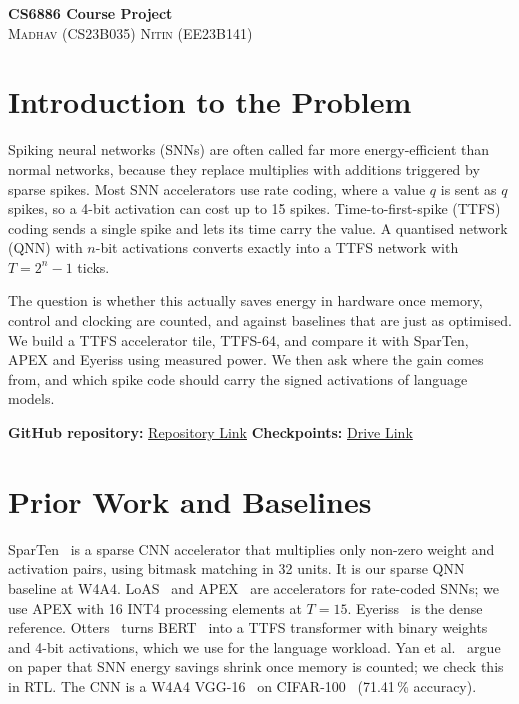 \documentclass[10pt,a4paper]{article}
\begin{document}
\thispagestyle{plain}

\begin{center}
  {\LARGE\sffamily\bfseries CS6886 Course Project}\\[8pt]
  {\large\scshape Madhav (CS23B035) \quad Nitin (EE23B141)}
\end{center}

\section{Introduction to the Problem}
\begin{content}
Spiking neural networks (SNNs) are often called far more energy-efficient than normal networks, because they
replace multiplies with additions triggered by sparse spikes. Most SNN accelerators use rate coding, where a value
$q$ is sent as $q$ spikes, so a 4-bit activation can cost up to 15 spikes. Time-to-first-spike (TTFS) coding
sends a single spike and lets its time carry the value. A quantised network (QNN) with $n$-bit activations
converts exactly into a TTFS network with $T = 2^n - 1$ ticks.

The question is whether this actually saves energy in hardware once memory, control and clocking are counted, and
against baselines that are just as optimised. We build a TTFS accelerator tile, TTFS-64, and compare it with
SparTen, APEX and Eyeriss using measured power. We then ask where the gain comes from, and which spike code
should carry the signed activations of language models.

\textbf{GitHub repository:} \href{https://github.com/Madhav1729/TTFS}{Repository Link}
\quad \textbf{Checkpoints:} \href{https://drive.google.com/file/d/1ULRXTGxmAl8MLo_yqgPOb0wExdkZ89UQ/view?usp=sharing}{Drive Link}
\end{content}

\section{Prior Work and Baselines}
\begin{content}
SparTen~\cite{sparten} is a sparse CNN accelerator that multiplies only non-zero weight and activation pairs,
using bitmask matching in 32 units. It is our sparse QNN baseline at W4A4. LoAS~\cite{loas} and APEX~\cite{apex}
are accelerators for rate-coded SNNs; we use APEX with 16 INT4 processing elements at $T = 15$. Eyeriss~\cite{eyeriss}
is the dense reference. Otters~\cite{otters} turns BERT~\cite{bert} into a TTFS transformer with binary weights
and 4-bit activations, which we use for the language workload. Yan et al.~\cite{yan} argue on paper that SNN
energy savings shrink once memory is counted; we check this in RTL. The CNN is a W4A4 VGG-16~\cite{cifarmodels}
on CIFAR-100~\cite{cifar} (71.41\,\% accuracy).
\end{content}
\end{document}
